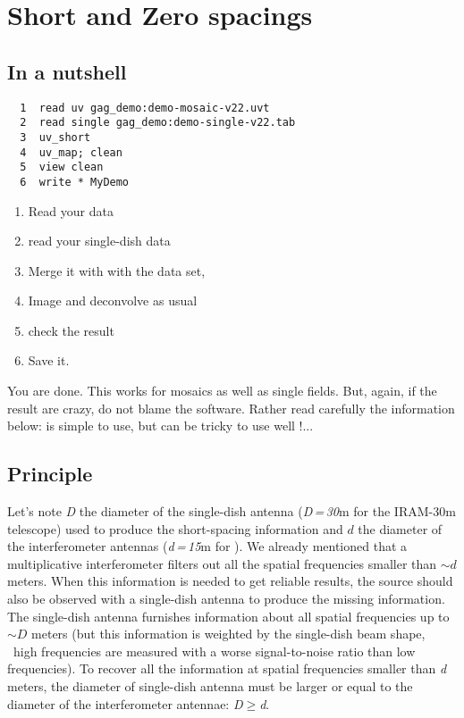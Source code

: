 \section{Short and Zero spacings} 
\label{sec:short-spacings}

\subsection{In a nutshell}

\begin{verbatim}
  1  read uv gag_demo:demo-mosaic-v22.uvt
  2  read single gag_demo:demo-single-v22.tab
  3  uv_short
  4  uv_map; clean
  5  view clean
  6  write * MyDemo
\end{verbatim}
\begin{enumerate}\itemsep 0pt
\item Read your \uv{} data
\item read your single-dish data
\item Merge it with with the \uv{} data set,
\item Image and deconvolve as usual
\item check the result
\item Save it. 
\end{enumerate}
You are done. This works for mosaics as well as single fields.
But, again, if the result are crazy, do not blame the software. 
Rather read carefully the information below: 
 is simple to use, but can be tricky to use well !...

\subsection{Principle}
Let's note \textit{D} the diameter of the single-dish antenna (\textit{D\,=\,30}m for the
IRAM-30m telescope) used to produce the short-spacing information and $d$
the diameter of the interferometer antennas (\textit{d\,=\,15}m for \NOEMA{}). We
already mentioned that a multiplicative interferometer filters out all the
spatial frequencies smaller than $\sim d$ meters. When this information is
needed to get reliable results, the source should also be observed with a
single-dish antenna to produce the missing information.  The single-dish
antenna furnishes information about all spatial frequencies up to $\sim D$
meters (but this information is weighted by the single-dish beam shape,
\ie\ high frequencies are measured with a worse signal-to-noise ratio than
low frequencies). To recover all the information at spatial frequencies
smaller than \textit{d} meters, the diameter of single-dish antenna must be
larger or equal to the diameter of the interferometer antennae: \textit{D}$\ge$\textit{d}.

